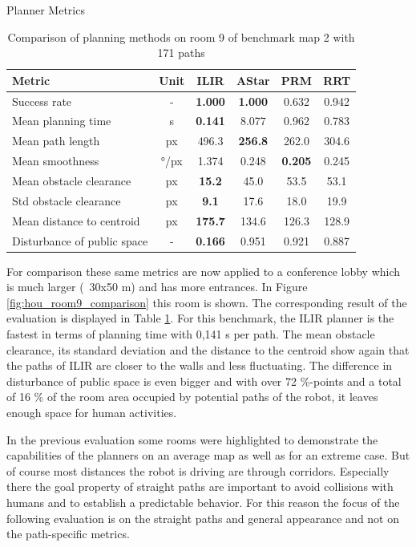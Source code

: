 \begin{table}[h]
\centering
\caption{Planner Metrics}
\label{tab:room9_results}
\begin{tabular}{lc|cccc}
\hline
\textbf{Metric}                    & \textbf{Unit} & \textbf{ILIR} & \textbf{AStar} & \textbf{PRM} & \textbf{RRT} \\
\hline
Success rate                       & -    & \textbf{1.000}          & \textbf{1.000}         & 0.632          & 0.942 \\
Mean planning time                 & s    & \textbf{0.141} & 8.077         & 0.962          & 0.783 \\
Mean path length                   & px   & 496.3          & \textbf{256.8}& 262.0          & 304.6 \\
Mean smoothness                    & °/px & 1.374          & 0.248         & \textbf{0.205} & 0.245 \\
Mean obstacle clearance            & px   & \textbf{15.2}  & 45.0          & 53.5           & 53.1  \\
Std obstacle clearance             & px   & \textbf{9.1}   & 17.6          & 18.0           & 19.9 \\
Mean distance to centroid          & px   & \textbf{175.7}          & 134.6         & 126.3          & 128.9  \\
Disturbance of public space        & -    & \textbf{0.166} & 0.951         & 0.921          & 0.887 \\
\hline
\end{tabular}
\caption{Comparison of planning methods on room 9 of benchmark map 2 with 171 paths}
\end{table}

For comparison these same metrics are now applied to a conference lobby which is much larger (~30x50 m) and has more entrances. In Figure \ref{fig:hou_room9_comparison} this room is shown. The corresponding result of the evaluation is displayed in Table \ref{tab:room9_results}. For this benchmark, the ILIR planner is the fastest in terms of planning time with 0,141 s per path. The mean obstacle clearance, its standard deviation and the distance to the centroid show again that the paths of ILIR are closer to the walls and less fluctuating. The difference in disturbance of public space is even bigger and with over 72 \%-points and a total of 16 \% of the room area occupied by potential paths of the robot, it leaves enough space for human activities. 

In the previous evaluation some rooms were highlighted to demonstrate the capabilities of the planners on an average map as well as for an extreme case. But of course most distances the robot is driving are through corridors. Especially there the goal property of straight paths are important to avoid collisions with humans and to establish a predictable behavior. For this reason the focus of the following evaluation is on the straight paths and general appearance and not on the path-specific metrics. 

